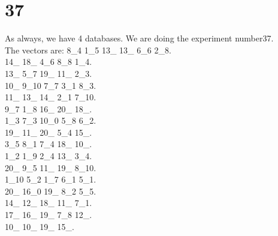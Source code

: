 \chapter{37}
\indent As always, we have 4 databases. We are doing the experiment number37.\\
The vectors are:
8\_4 1\_5 13\_ 13\_ 6\_6 2\_8.\\14\_ 18\_ 4\_6 8\_8 1\_4.\\13\_ 5\_7 19\_ 11\_ 2\_3.\\10\_ 9\_10 7\_7 3\_1 8\_3.\\11\_ 13\_ 14\_ 2\_1 7\_10.\\9\_7 1\_8 16\_ 20\_ 18\_.\\1\_3 7\_3 10\_0 5\_8 6\_2.\\19\_ 11\_ 20\_ 5\_4 15\_.\\3\_5 8\_1 7\_4 18\_ 10\_.\\1\_2 1\_9 2\_4 13\_ 3\_4.\\20\_ 9\_5 11\_ 19\_ 8\_10.\\1\_10 5\_2 1\_7 6\_1 5\_1.\\20\_ 16\_0 19\_ 8\_2 5\_5.\\14\_ 12\_ 18\_ 11\_ 7\_1.\\17\_ 16\_ 19\_ 7\_8 12\_.\\10\_ 10\_ 19\_ 15\_.\\